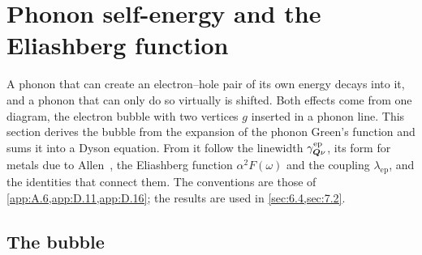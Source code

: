 \section{Phonon self-energy and the Eliashberg function}\label{app:D.17}

A phonon that can create an electron--hole pair of its own energy decays into it, and a phonon that can only do so virtually is shifted. Both effects come from one diagram, the electron bubble with two vertices $g$ inserted in a phonon line. This section derives the bubble from the expansion of the phonon Green's function and sums it into a Dyson equation. From it follow the linewidth $\gamma^{\mathrm{ep}}_{\bm{Q}\nu}$, its form for metals due to Allen~\cite{allen1972neutron}, the Eliashberg function $\alpha^2F(\omega)$ and the coupling $\lambda_{\mathrm{ep}}$, and the identities that connect them. The conventions are those of \cref{app:A.6,app:D.11,app:D.16}; the results are used in \cref{sec:6.4,sec:7.2}.

\subsection*{The bubble}

